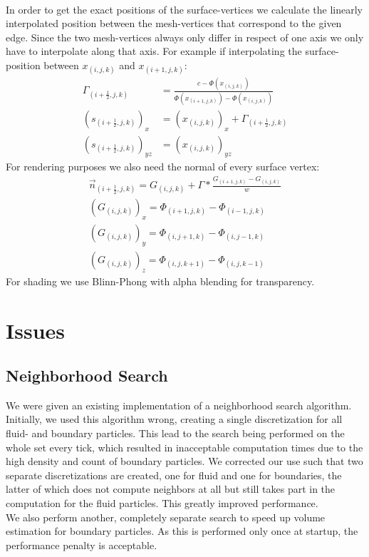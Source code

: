\documentclass{ACGSeminar}
\begin{document}
\\
In order to get the exact positions of the surface-vertices we calculate the linearly interpolated position between the mesh-vertices that correspond to the given edge. Since the two mesh-vertices always only differ in respect of one axis we only have to interpolate along that axis. For example if interpolating the surface-position between \(x_{(i,j,k)}\) and \(x_{(i+1,j,k)}\):
\begin{equation} \label{eq:implicit_surface}
\begin{aligned}
\Gamma_{(i+\frac{1}{2},j,k)} &= \frac{c - \Phi(x_{(i,j,k)})}{\Phi(x_{(i+1,j,k)}) -\Phi(x_{(i,j,k)})} \\
(s_{(i+\frac{1}{2},j,k)})_x &= (x_{(i,j,k)})_x + \Gamma_{(i+\frac{1}{2},j,k)} \\
(s_{(i+\frac{1}{2},j,k)})_{yz} &= (x_{(i,j,k)})_{yz}
\end{aligned} 
\end{equation}
For rendering purposes we also need the normal of every surface vertex:
\begin{equation} \label{eq:implicit_surface}
\begin{aligned}
\vec{n}_{(i+\frac{1}{2},j,k)} = G_{(i,j,k)} + \Gamma * \frac{G_{(i+1,j,k)}-G_{(i,j,k)}}{w}
\\
(G_{(i,j,k)})_x = \Phi_{(i+1,j,k)} - \Phi_{(i-1,j,k)} \\
(G_{(i,j,k)})_y = \Phi_{(i,j+1,k)} - \Phi_{(i,j-1,k)} \\
(G_{(i,j,k)})_z = \Phi_{(i,j,k+1)} - \Phi_{(i,j,k-1)}
\end{aligned} 
\end{equation}
For shading we use Blinn-Phong with alpha blending for transparency.

\section{Issues}
\subsection{Neighborhood Search}
We were given an existing implementation of a neighborhood search algorithm. Initially, we used this algorithm wrong, creating a single discretization for all fluid- and boundary particles. This lead to the search being performed on the whole set every tick, which resulted in inacceptable computation times due to the high density and count of boundary particles. We corrected our use such that two separate discretizations are created, one for fluid and one for boundaries, the latter of which does not compute neighbors at all but still takes part in the computation for the fluid particles. This greatly improved performance.\\
We also perform another, completely separate search to speed up volume estimation for boundary particles. As this is performed only once at startup, the performance penalty is acceptable.
\end{document}
